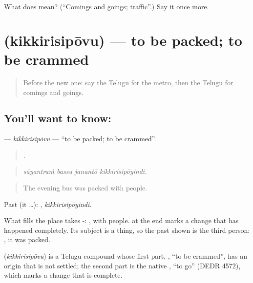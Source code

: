 \begin{tcolorbox}[breakable,colback=teal!4,colframe=teal!35!black,title={Before you move on}]
What does  mean? (\textquotedblleft{}Comings and goings; traffic\textquotedblright{}.) Say it once more.
\end{tcolorbox}
\section[\texorpdfstring{\te{కిక్కిరిసిపోవు} (kikkirisipōvu)}{కిక్కిరిసిపోవు (kikkirisipōvu)}]{ (kikkirisipōvu) — to be packed; to be crammed}

\label{lesson:TE-C442-kikkirisipovu}



\begin{quote}
Before the new one: say the Telugu for the metro, then the Telugu for comings and goings.
\end{quote}

\subsection*{You'll want to know: }
\textbf{} — \emph{kikkirisipōvu} — \textquotedblleft{}to be packed; to be crammed\textquotedblright{}.

\begin{quote}
   .
\end{quote}

\begin{quote}
\emph{sāyantraṁ bassu janantō kikkirisipōyindi.}
\end{quote}

\begin{quote}
The evening bus was packed with people.
\end{quote}

Past (it …): , \emph{kikkirisipōyindi}.

What fills the place takes -: , with people.  at the end marks a change that has happened completely. Its subject is a thing, so the past shown is the third person: , it was packed.

\begin{cousinweb}
\textbf{} (\emph{kikkirisipōvu}) is a Telugu compound whose first part, , \textquotedblleft{}to be crammed\textquotedblright{}, has an origin that is not settled; the second part is the native , \textquotedblleft{}to go\textquotedblright{} (DEDR 4572), which marks a change that is complete.
\end{cousinweb}

